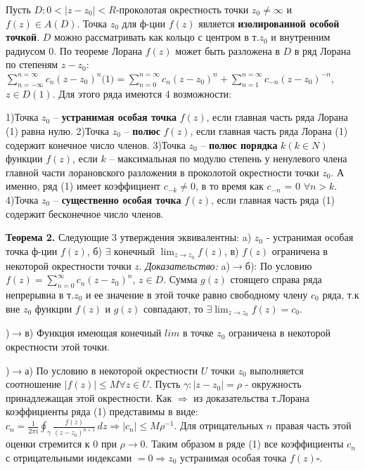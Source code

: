 Пусть $D:0<|z-z_0|<R$-проколотая окрестность точки $z_0\neq\infty$ и $f(z) \in A(D)$. Точка $z_0$ для ф-ции $f(z)$ является \textbf{изолированной особой точкой}. $D$ можно рассматривать как кольцо с центром в т.$z_0$ и внутренним радиусом 0. По теореме Лорана $f(z)$ может быть разложена в $D$ в ряд Лорана по степеням $z-z_0$: $\sum_{n=-\infty}^{n=\infty}c_n(z-z_0)^n\text{(1)}=\sum_{n=0}^{n=\infty}c_n(z-z_0)^n +\sum_{n=1}^{n=\infty}c_{-n}(z-z_0)^{-n}$, $z \in D(1)$.
Для этого ряда имеются 4 возможности:

    1)Точка $z_0$ – \textbf{устранимая особая точка} $f(z)$, если главная часть ряда Лорана (1) равна нулю.
    2)Точка $z_0$ – \textbf{полюс} $f(z)$, если главная часть ряда Лорана (1) содержит конечное число членов.    
    3)Точка $z_0$ – \textbf{полюс порядка} $k (k \in N)$ функции $f(z)$, если $k$
– максимальная по модулю степень у ненулевого члена главной части лорановского разложения в проколотой окрестности точки $z_0$. А именно, ряд (1) имеет коэффициент $c_{-k}\neq 0$,
в то время как $c_{-n}$ = 0 $\forall n > k$.
    4)Точка $z_0$ – \textbf{существенно особая точка} $f(z)$, если
главная часть ряда (1) содержит бесконечное число членов.


\textbf{Теорема 2.} Следующие 3 утверждения эквивалентны: a) $z_0$ - устранимая особая точка ф-ции $f(z)$, б) $\exists$ конечный $\displaystyle\lim_{z\rightarrow z_0}f(z)$, в) $f(z)$ ограничена в некоторой окрестности точки $z$.
\textit{Доказательство:}
    a)$\rightarrow$б): По условию $f(z)=\sum_{n=0}^{\infty}c_n(z-z_0)^n$, $z \in D$. Сумма $g(z)$ стоящего справа ряда непрерывна в т.$z_0$ и ее значение в этой точке равно свободному члену $c_0$ ряда, т.к вне $z_0$ функции $f(z)$ и $g(z)$ совпадают, то $\exists \displaystyle\lim_{z\rightarrow z_0}f(z)=c_0$.
    
    )$\rightarrow$в) Функция имеющая конечный $lim$ в точке $z_0$ ограничена в некоторой окрестности этой точки.

    )$\rightarrow$а) По условию в некоторой окрестности $U$ точки $z_0$ выполняется соотношение $|f(z)|\leq M \forall z \in U$. Пусть $\gamma:|z-z_0|=\rho$ - окружность принадлежащая этой окрестности. Как $\Rightarrow$ из доказательства т.Лорана коэффициенты ряда (1) представимы в виде: $c_n = \frac{1}{2\pi i} \oint_{\gamma} \frac{f(z)}{(z-z_0)^{n+1}} \,dz \Rightarrow |c_n|\leq M\rho^{-1}$. Для отрицательных $n$ правая часть этой оценки стремится к 0 при $\rho \rightarrow 0$. Таким образом в ряде (1) все коэффициенты $c_n$ с отрицательными индексами $=0\Rightarrow z_0$ устранимая особая точка $f(z) \square$. 



